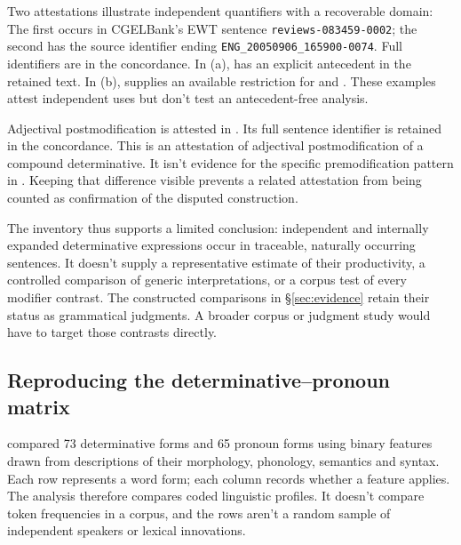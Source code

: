 \documentclass[12pt]{article}
\begin{document}
Two attestations illustrate independent quantifiers with a recoverable domain:
\ea\label{ex:attested-quantifiers}
\ea {}
\ex {}
\z\z
The first occurs in CGELBank's EWT sentence \nolinkurl{reviews-083459-0002}; the second has the source identifier ending \texttt{ENG\_20050906\_165900-0074}. Full identifiers are in the concordance. In (a),  has an explicit antecedent in the retained text. In (b),  supplies an available restriction for  and . These examples attest independent uses but don't test an antecedent-free analysis.

Adjectival postmodification is attested in . Its full sentence identifier is retained in the concordance. This is an attestation of adjectival postmodification of a compound determinative. It isn't evidence for the specific premodification pattern in . Keeping that difference visible prevents a related attestation from being counted as confirmation of the disputed construction.

The inventory thus supports a limited conclusion: independent and internally expanded determinative expressions occur in traceable, naturally occurring sentences. It doesn't supply a representative estimate of their productivity, a controlled comparison of generic interpretations, or a corpus test of every modifier contrast. The constructed comparisons in §\ref{sec:evidence} retain their status as grammatical judgments. A broader corpus or judgment study would have to target those contrasts directly.

\subsection{Reproducing the determinative--pronoun matrix}

\textcite{reynolds2021} compared 73 determinative forms and 65 pronoun forms using binary features drawn from descriptions of their morphology, phonology, semantics and syntax. Each row represents a word form; each column records whether a feature applies. The analysis therefore compares coded linguistic profiles. It doesn't compare token frequencies in a corpus, and the rows aren't a random sample of independent speakers or lexical innovations.
\end{document}
